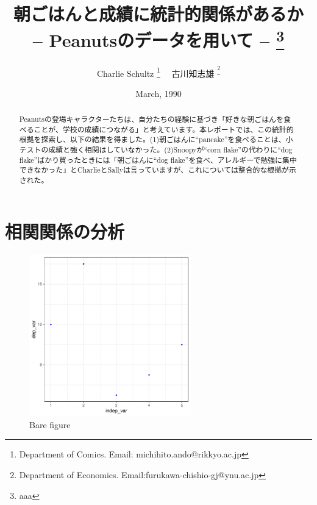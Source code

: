 \documentclass[xelatex,ja=standard]{bxjsarticle}
\title{朝ごはんと成績に統計的関係があるか \\ -- Peanutsのデータを用いて -- \thanks{aaa}}
\author{Charlie Schultz
\thanks{Department of Comics. Email: michihito.ando@rikkyo.ac.jp}  \ \  古川知志雄
\textsuperscript\thanks{Department of Economics. Email:furukawa-chishio-gj@ynu.ac.jp}}
\date{March, 1990}
\begin{document}
\renewcommand\footnotelayout{\small}
\sffamily\mdseries

\maketitle

\vspace{-10pt}\begin{abstract}
\begin{spacing}{1}
\noindent 
Peanutsの登場キャラクターたちは、自分たちの経験に基づき「好きな朝ごはんを食べることが、学校の成績につながる」と考えています。本レポートでは、この統計的根拠を探索し、以下の結果を得ました。(1)朝ごはんに``pancake''を食べることは、小テストの成績と強く相関はしていなかった。(2)Snoopyが``corn flake''の代わりに``dog flake''ばかり買ったときには「朝ごはんに``dog flake''を食べ、アレルギーで勉強に集中できなかった」とCharlieとSallyは言っていますが、これについては整合的な根拠が示された。\\

\end{spacing}
\end{abstract}

\newpage

\section{相関関係の分析} 


\begin{figure}
\centering
\includegraphics[width=7cm]{04_analyze/scatter_regress/figure/figure.pdf}

\label{fig:img1}
\caption{Bare figure}
\end{figure}

\mcfamily\mdseries


\end{document}
